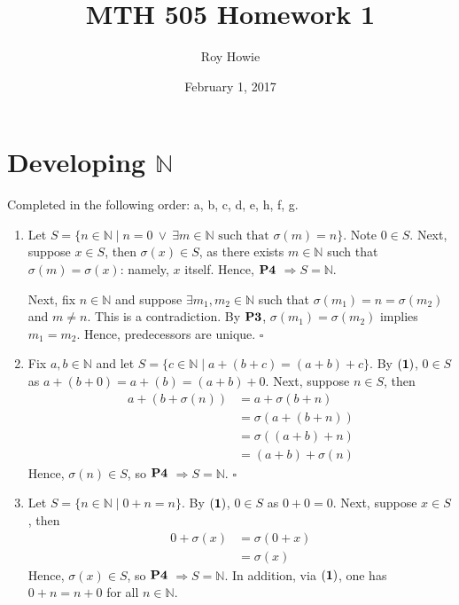 \documentclass{article}
\begin{document}
\title{MTH 505 Homework 1}
\author{Roy Howie}
\date{February 1, 2017}
\maketitle

\section{Developing $\mathbb{N}$}
Completed in the following order: a, b, c, d, e, h, f, g.
\begin{enumerate}[label=\textbf{(\alph*)}]
\item{
	Let
	$S=\{ n \in \mathbb{N} \mid n = 0 \ \vee \
		\exists m \in \mathbb{N} \text{ such that } \sigma(m)=n
	\}$.
	Note $0 \in S$.
	Next, suppose $x \in S$, then $\sigma(x) \in S$, as
	there exists $m \in \mathbb{N}$ such that
	$\sigma(m) = \sigma(x)$: namely, $x$ itself.
	Hence, $\bf{P4}$
	$\Rightarrow S = \mathbb{N}$.

	Next, fix $n \in \mathbb{N}$ and suppose
	$\exists m_1,m_2 \in \mathbb{N}$ such that
	$\sigma(m_1) = n = \sigma(m_2)$ and $m \ne n$.
	This is a contradiction.
	By $\bf{P3}$, $\sigma(m_1)=\sigma(m_2)$ implies $m_1=m_2$.
	Hence, predecessors are unique.
	\hfill $\square$
}

\item{
	Fix $a,b \in \mathbb{N}$ and let
	$S=\{ c \in \mathbb{N} \mid a+(b+c)=(a+b)+c \}$.
	By $\bf{(1)}$, $0 \in S$ as
	$a+(b+0) = a+(b) = (a+b) + 0$.
	Next, suppose $n \in S$, then
	\begin{align*}
		a+(b+\sigma(n))&= a+\sigma(b+n)		\tag{2} \\
                       &= \sigma(a+(b+n))	\tag{2} \\
                       &= \sigma((a+b)+n)	\tag{IH}\\
                       &= (a+b) + \sigma(n) \tag{2}
	\end{align*}
	Hence, $\sigma(n) \in S$, so $\bf{P4}$
	$\Rightarrow S = \mathbb{N}$.
	\hfill $\square$
}
\item{
	Let $S = \{ n \in \mathbb{N} \mid 0 + n = n \}$.
	By $\bf{(1)}$, $0 \in S$ as $0+0=0$.
	Next, suppose $x \in S$, then
	\begin{align*}
		0 + \sigma(x) &= \sigma(0 + x)	\tag{2} \\
					  &= \sigma(x)		\tag{IH}
	\end{align*}
	Hence, $\sigma(x) \in S$, so $\bf{P4}$
	$\Rightarrow S = \mathbb{N}$. In addition,
	via $\bf{(1)}$, one has
	$ 0 + n = n + 0$ for all $n \in \mathbb{N}$.
	
}
\end{enumerate}
\end{document}
